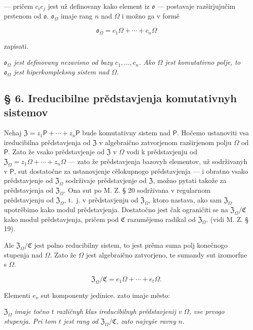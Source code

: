 \documentclass[11pt]{article}
\begin{document}
--- pričem \(c_ic_j\) jest už definovany kako element iz \(\mathfrak{o}\) --- postavaje razširjujučim prstenom od \(\mathfrak{o}\). \(\mathfrak{o}_{\Omega}\) imaje rang \(n\) nad \(\Omega\) i možno ga v formě

\[
\mathfrak{o}_{\Omega}=c_1\Omega+\cdots+c_n\Omega
\]

zapisati.

\emph{\(\mathfrak{o}_{\Omega}\) jest definovany nezavisno od bazy \(c_1,\ldots,c_n\). Ako \(\Omega\) jest komutativno polje, to \(\mathfrak{o}_{\Omega}\) jest hiperkompleksny sistem nad \(\Omega\).}

\subsection*{§ 6. Ireducibilne prědstavjenja komutativnyh sistemov}\label{die-irreduziblen-darstellungen-kommutativer-systeme}

Nehaj \(\mathfrak Z=z_1\mathsf P+\cdots+z_n\mathsf P\) bude komutativny sistem nad \(\mathsf P\). Hočemo ustanoviti vsa ireducibilna prědstavjenja od \(\mathfrak Z\) v algebraično zatvorjenom razširjenom polju \(\Omega\) od \(\mathsf P\). Zato že vsako prědstavjenje od \(\mathfrak Z\) v \(\Omega\) vodi k prědstavjenju od \(\mathfrak Z_\Omega=z_1\Omega+\cdots+z_n\Omega\) --- zato že prědstavjenja bazovyh elementov, už sodrživanyh v \(\mathsf P\), sut dostatočne za ustanovjenje cělokupnogo prědstavjenja --- i obratno vsako prědstavjenje od \(\mathfrak Z_\Omega\) sodrživaje prědstavjenje od \(\mathfrak Z\), možno pytati takože za prědstavjenja od \(\mathfrak Z_\Omega\). Ona sut po M. Z. § 20 sodrživana v regularnom prědstavjenju od \(\mathfrak Z_\Omega\), t.~j. v prědstavjenju od \(\mathfrak Z_\Omega\), ktoro nastava, ako sam \(\mathfrak Z_\Omega\) upotrěbimo kako modul prědstavjenja. Dostatočno jest čak ograničiti se na \(\mathfrak Z_\Omega/\mathfrak C\) kako modul prědstavjenja, pričem pod \(\mathfrak C\) razumějemo radikal od \(\mathfrak Z_\Omega\). (vidi M. Z. § 19).

Ale \(\mathfrak Z_\Omega/\mathfrak C\) jest polno reducibilny sistem, to jest prěma suma polj konečnogo stupenja nad \(\Omega\). Zato že \(\Omega\) jest algebraično zatvorjeno, te sumandy sut izomorfne s \(\Omega\).

\[
\mathfrak Z_\Omega/\mathfrak C=e_1\Omega+\cdots+e_t\Omega.
\]

Elementi \(e_\nu\) sut komponenty jedinice. zato imaje město:

\emph{\(\mathfrak Z_\Omega\) imaje točno \(t\) različnyh klas ireducibilnyh prědstavjenij v \(\Omega\), vse prvogo stupenja. Pri tom \(t\) jest rang od \(\mathfrak Z_\Omega/\mathfrak C\), zato najvyše ravny \(n\).}
\end{document}
